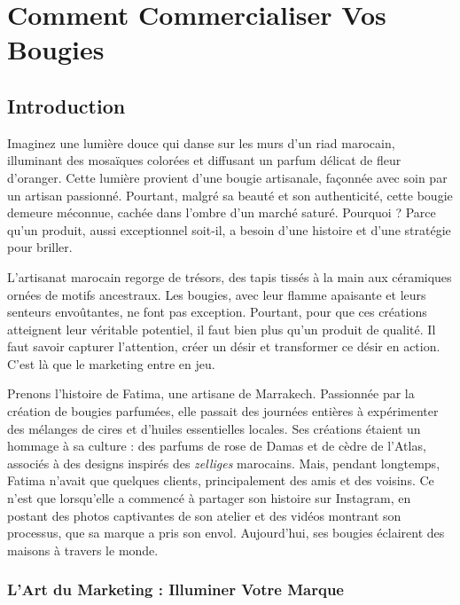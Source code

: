 \documentclass[11pt,fleqn,onecolumn,oneside]{book}
\begin{document}
\chapter{Comment Commercialiser Vos Bougies}

\section{Introduction}

\begin{definition}
Imaginez une lumière douce qui danse sur les murs d’un riad marocain, illuminant des mosaïques colorées et diffusant un parfum délicat de fleur d’oranger. Cette lumière provient d’une bougie artisanale, façonnée avec soin par un artisan passionné. Pourtant, malgré sa beauté et son authenticité, cette bougie demeure méconnue, cachée dans l’ombre d’un marché saturé. Pourquoi ? Parce qu’un produit, aussi exceptionnel soit-il, a besoin d’une histoire et d’une stratégie pour briller.
\end{definition}

L’artisanat marocain regorge de trésors, des tapis tissés à la main aux céramiques ornées de motifs ancestraux. Les bougies, avec leur flamme apaisante et leurs senteurs envoûtantes, ne font pas exception. Pourtant, pour que ces créations atteignent leur véritable potentiel, il faut bien plus qu’un produit de qualité. Il faut savoir capturer l’attention, créer un désir et transformer ce désir en action. C’est là que le marketing entre en jeu.

\begin{example}
Prenons l’histoire de Fatima, une artisane de Marrakech. Passionnée par la création de bougies parfumées, elle passait des journées entières à expérimenter des mélanges de cires et d’huiles essentielles locales. Ses créations étaient un hommage à sa culture : des parfums de rose de Damas et de cèdre de l’Atlas, associés à des designs inspirés des \textit{zelliges} marocains. Mais, pendant longtemps, Fatima n’avait que quelques clients, principalement des amis et des voisins. Ce n’est que lorsqu’elle a commencé à partager son histoire sur Instagram, en postant des photos captivantes de son atelier et des vidéos montrant son processus, que sa marque a pris son envol. Aujourd’hui, ses bougies éclairent des maisons à travers le monde.
\end{example}

\subsection*{L’Art du Marketing : Illuminer Votre Marque}
\end{document}
